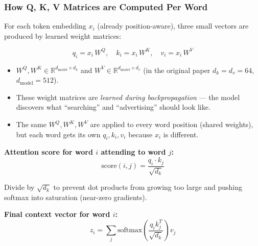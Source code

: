 \begin{frame}[fragile]\frametitle{How Q, K, V Matrices are Computed Per Word}

For each token embedding $x_i$ (already position-aware), three small vectors are produced by learned weight matrices:

$$q_i = x_i \, W^Q, \quad k_i = x_i \, W^K, \quad v_i = x_i \, W^V$$

\begin{itemize}
\item $W^Q, W^K \in \mathbb{R}^{d_{\text{model}} \times d_k}$ and $W^V \in \mathbb{R}^{d_{\text{model}} \times d_v}$ (in the original paper $d_k = d_v = 64$, $d_{\text{model}}=512$).
\item These weight matrices are \emph{learned during backpropagation} --- the model discovers what ``searching'' and ``advertising'' should look like.
\item The same $W^Q, W^K, W^V$ are applied to every word position (shared weights), but each word gets its own $q_i, k_i, v_i$ because $x_i$ is different.
\end{itemize}

\textbf{Attention score for word $i$ attending to word $j$:}
$$\text{score}(i,j) = \frac{q_i \cdot k_j}{\sqrt{d_k}}$$

Divide by $\sqrt{d_k}$ to prevent dot products from growing too large and pushing softmax into saturation (near-zero gradients).

\textbf{Final context vector for word $i$:}
$$z_i = \sum_j \text{softmax}\!\left(\frac{q_i k_j^T}{\sqrt{d_k}}\right) v_j$$

\end{frame}

